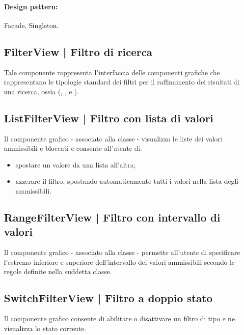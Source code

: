 \documentclass[10pt,a4paper,headinclude,footinclude,hidelinks]{scrreprt} %
\begin{document}
	\paragraph{Design pattern:} Facade, Singleton.

	\subsection[FilterView]{FilterView | Filtro di ricerca}
	\label{sec:stage:design:sistema:view.filter:filter}
	Tale componente rappresenta l'interfaccia delle componenti grafiche che rappresentano le tipologie standard dei filtri per il raffinamento dei risultati di una ricerca, ossia (\textit{}, \textit{}, \textit{} e \textit{}).

	\subsection[ListFilterView]{ListFilterView | Filtro con lista di valori}
	\label{sec:stage:design:sistema:view.filter:list-filter}
	Il componente grafico - associato alla classe \textit{} - visualizza le liste dei valori ammissibili e bloccati e consente all'utente di:
	\begin{itemize}
	\item spostare un valore da una lista all'altra;
	\item azzerare il filtro, spostando automaticamente tutti i valori nella lista degli ammissibili.
	\end{itemize}

	\subsection[RangeFilterView]{RangeFilterView | Filtro con intervallo di valori}
	\label{sec:stage:design:sistema:view.filter:range-filter}
	Il componente grafico - associato alla classe \textit{} - permette all'utente di specificare l'estremo inferiore e superiore dell'intervallo dei valori ammissibili secondo le regole definite nella suddetta classe.

	\subsection[SwitchFilterView]{SwitchFilterView | Filtro a doppio stato}
	\label{sec:stage:design:sistema:view.filter:switch-filter}
	Il componente grafico consente di abilitare o disattivare un filtro di tipo \textit{} e ne visualizza lo stato corrente.
\end{document}

